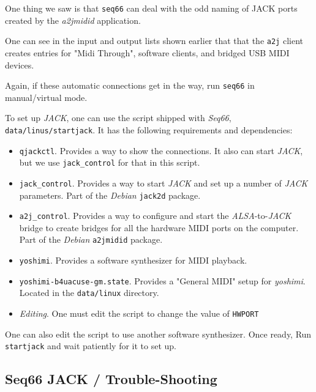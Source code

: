    One thing we saw is that \texttt{seq66} can deal with the odd naming
   of JACK ports created by the \textsl{a2jmidid} application.

   One can see in the input and output lists shown earlier
   that that the \texttt{a2j} client creates entries for "Midi Through",
   software clients, and bridged USB MIDI devices.

   Again, if these automatic connections get in the way, run \texttt{seq66} in
   manual/virtual mode.

   To set up \textsl{JACK}, one can use the script shipped with
   \textsl{Seq66}, \texttt{data/linus/startjack}.  It has the following
   requirements and dependencies:

   \begin{itemize}
      \item \texttt{qjackctl}.  Provides a way to show the connections. It also
         can start \textsl{JACK}, but we use \texttt{jack\_control} for that in
         this script.
      \item \texttt{jack\_control}.  Provides a way to start \textsl{JACK}
         and set up a number of \textsl{JACK} parameters.
         Part of the \textsl{Debian} \texttt{jack2d} package.
      \item \texttt{a2j\_control}.  Provides a way to configure and start the
         \textsl{ALSA}-to-\textsl{JACK} bridge to create bridges for all the
         hardware MIDI ports on the computer.
         Part of the \textsl{Debian} \texttt{a2jmidid} package.
      \item \texttt{yoshimi}.  Provides a software synthesizer for MIDI
         playback.
      \item \texttt{yoshimi-b4uacuse-gm.state}.  Provides a "General MIDI"
      setup for \textsl{yoshimi}.  Located in the \texttt{data/linux}
      directory.
      \item \textsl{Editing}.  One must edit the script to change the value of
      \texttt{HWPORT}
   \end{itemize}

   One can also edit the script to use another software synthesizer.
   Once ready, 
   Run \texttt{startjack} and wait patiently for it to set up.

\subsection{Seq66 JACK / Trouble-Shooting}
\label{subsec:jack_testing}

